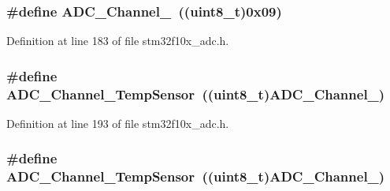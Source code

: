 \subsubsection[{\texorpdfstring{A\+D\+C\+\_\+\+Channel\+\_\+9}{ADC_Channel_9}}]{\setlength{\rightskip}{0pt plus 5cm}\#define A\+D\+C\+\_\+\+Channel\+\_~(({\bf uint8\+\_\+t})0x09)}\hypertarget{group___a_d_c__channels_ga01a61c428be0cb69327e428e32a42aa1}{}\label{group___a_d_c__channels_ga01a61c428be0cb69327e428e32a42aa1}


Definition at line 183 of file stm32f10x\+\_\+adc.\+h.

\subsubsection[{\texorpdfstring{A\+D\+C\+\_\+\+Channel\+\_\+\+Temp\+Sensor}{ADC_Channel_TempSensor}}]{\setlength{\rightskip}{0pt plus 5cm}\#define A\+D\+C\+\_\+\+Channel\+\_\+\+Temp\+Sensor~(({\bf uint8\+\_\+t}){\bf A\+D\+C\+\_\+\+Channel\+\_})}\hypertarget{group___a_d_c__channels_ga1efc096b8d4a8d15c4a7d91f5c03c6c7}{}\label{group___a_d_c__channels_ga1efc096b8d4a8d15c4a7d91f5c03c6c7}


Definition at line 193 of file stm32f10x\+\_\+adc.\+h.

\subsubsection[{\texorpdfstring{A\+D\+C\+\_\+\+Channel\+\_\+\+Temp\+Sensor}{ADC_Channel_TempSensor}}]{\setlength{\rightskip}{0pt plus 5cm}\#define A\+D\+C\+\_\+\+Channel\+\_\+\+Temp\+Sensor~(({\bf uint8\+\_\+t}){\bf A\+D\+C\+\_\+\+Channel\+\_})}\hypertarget{group___a_d_c__channels_ga1efc096b8d4a8d15c4a7d91f5c03c6c7}{}\label{group___a_d_c__channels_ga1efc096b8d4a8d15c4a7d91f5c03c6c7}


